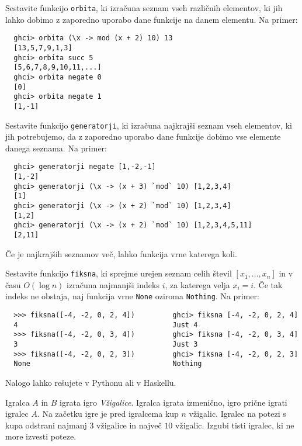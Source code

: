 \documentclass[arhiv]{../izpit}
\begin{document}
\podnaloga
  Sestavite funkcijo \texttt{orbita}, ki izračuna seznam vseh različnih
  elementov, ki jih lahko dobimo z zaporedno uporabo dane funkcije na danem
  elementu. Na primer:
  \begin{verbatim}
  ghci> orbita (\x -> mod (x + 2) 10) 13
  [13,5,7,9,1,3]
  ghci> orbita succ 5
  [5,6,7,8,9,10,11,...]
  ghci> orbita negate 0
  [0]
  ghci> orbita negate 1
  [1,-1]
  \end{verbatim}

\podnaloga
  Sestavite funkcijo \texttt{generatorji}, ki izračuna najkrajši seznam vseh
  elementov, ki jih potrebujemo, da z zaporedno uporabo dane funkcije dobimo
  vse elemente danega seznama. Na primer:
  \begin{verbatim}
  ghci> generatorji negate [1,-2,-1]
  [1,-2]
  ghci> generatorji (\x -> (x + 3) `mod` 10) [1,2,3,4]
  [1]
  ghci> generatorji (\x -> (x + 2) `mod` 10) [1,2,3,4]
  [1,2]
  ghci> generatorji (\x -> (x + 2) `mod` 10) [1,2,3,4,5,11]
  [2,11] 
  \end{verbatim}
  Če je najkrajših seznamov več, lahko funkcija vrne katerega koli.


  Sestavite funkcijo \texttt{fiksna}, ki sprejme urejen seznam celih števil 
  $[x_1, \dots, x_n]$ in v času $O(\log n)$ izračuna najmanjši indeks $i$, za katerega velja $x_i = i$.
  Če tak indeks ne obstaja, naj funkcija vrne \texttt{None} oziroma \texttt{Nothing}.
  Na primer:

  \begin{verbatim}
  >>> fiksna([-4, -2, 0, 2, 4])         ghci> fiksna [-4, -2, 0, 2, 4]
  4                                     Just 4
  >>> fiksna([-4, -2, 0, 3, 4])         ghci> fiksna [-4, -2, 0, 3, 4]
  3                                     Just 3
  >>> fiksna([-4, -2, 0, 2, 3])         ghci> fiksna [-4, -2, 0, 2, 3]
  None                                  Nothing
  \end{verbatim}   
  Nalogo lahko rešujete v Pythonu ali v Haskellu.



Igralca $A$ in $B$ igrata igro {\em Vžigalice}. Igralca igrata
izmenično, igro prične igrati igralec $A$. Na začetku igre je pred igralcema
kup $n$ vžigalic. Igralec na potezi s kupa odstrani najmanj $3$ vžigalice 
in največ $10$ vžigalic. Izgubi tisti igralec, ki ne more izvesti poteze.
\end{document}
